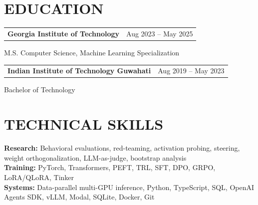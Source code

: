 \documentclass[10pt,letterpaper]{article}
\makeatletter
\newcommand{\school}[3]{%
  \begin{tabularx}{\linewidth}{@{}X r@{}}\textbf{#1} & {\small #3}\end{tabularx}\par
  {\small #2}\par\vspace{3pt}}
\makeatother
\begin{document}
\section*{EDUCATION}
\school{Georgia Institute of Technology}{M.S. Computer Science, Machine Learning Specialization}{Aug 2023 -- May 2025}
\school{Indian Institute of Technology Guwahati}{Bachelor of Technology}{Aug 2019 -- May 2023}

\section*{TECHNICAL SKILLS}
{\small
\textbf{Research:} Behavioral evaluations, red-teaming, activation probing, steering, weight orthogonalization, LLM-as-judge, bootstrap analysis\\[2pt]
\textbf{Training:} PyTorch, Transformers, PEFT, TRL, SFT, DPO, GRPO, LoRA/QLoRA, Tinker\\[2pt]
\textbf{Systems:} Data-parallel multi-GPU inference, Python, TypeScript, SQL, OpenAI Agents SDK, vLLM, Modal, SQLite, Docker, Git
}
\end{document}
